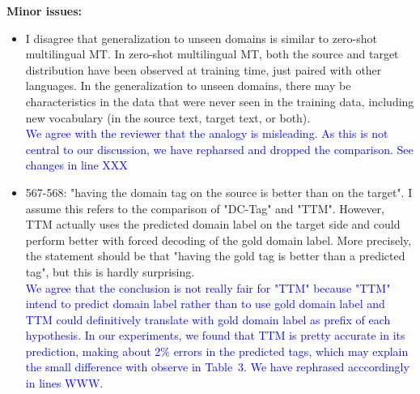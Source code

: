 \documentclass[12pt,times,a4paper,twoside]{article}
\newcommand{\fyTodo}[1]{\Todo[FY:]{\textcolor{orange}{#1}}}
\theoremstyle{definition}
\begin{document}
\noindent\textbf{Minor issues:}
\begin{itemize}
\item I disagree that generalization to unseen domains is similar to zero-shot multilingual MT. In zero-shot multilingual MT, both the source and target distribution have been observed at training time, just paired with other languages. In the generalization to unseen domains, there may be characteristics in the data that were never seen in the training data, including new vocabulary (in the source text, target text, or both).
  \\
  \textcolor{blue}{We agree with the reviewer that the analogy is misleading. As this is not central to our discussion, we have repharsed and dropped the comparison. See changes in line XXX}\fyTodo{Changes line in.}
\item 567-568: "having the domain tag on the source is better than on the target". I assume this refers to the comparison of "DC-Tag" and "TTM". However, TTM actually uses the predicted domain label on the target side and could perform better with forced decoding of the gold domain label. More precisely, the statement should be that "having the gold tag is better than a predicted tag", but this is hardly surprising.
  \\
  \textcolor{blue}{We agree that the conclusion is not really fair for "TTM" because "TTM" intend to predict domain label rather than to use gold domain label and TTM could definitively translate with gold domain label as prefix of each hypothesis. In our experiments, we found that TTM is pretty accurate in its prediction, making about 2\% errors in the predicted tags, which may explain the small difference with observe in Table~3. We have rephrased acccordingly in lines WWW.}\fyTodo{Add lines}
\end{itemize}
\end{document}
